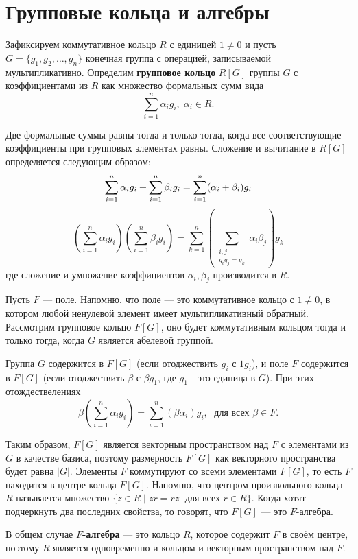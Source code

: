 \section{Групповые кольца и алгебры}\label{group_algebra}

Зафиксируем коммутативное кольцо $R$ с единицей $1 \neq 0$ и пусть $G = \{ g_1, g_2, \ldots, g_n\}$ конечная группа с операцией, записываемой мультипликативно. Определим \textbf{групповое кольцо} $R[G]$ группы $G$ с коэффициентами из $R$ как множество формальных сумм вида 
\[
	\sum\limits_{i=1}^{n} \alpha_i g_i, \; \alpha_i \in R.
\]

Две формальные суммы равны тогда и только тогда, когда все соответствующие коэффициенты при групповых элементах равны. Сложение и вычитание в $R[G]$ определяется следующим образом:
\[
 \sum\limits_{i=1}^{n} \alpha_i g_i + \sum\limits_{i=1}^{n} \beta_i g_i = \sum\limits_{i=1}^{n} (\alpha_i + \beta_i) g_i \\
\]
\[  
 \left( \sum\limits_{i=1}^{n} \alpha_i g_i \right) \left(\sum\limits_{i=1}^{n} \beta_i g_i \right) =  
 \sum\limits_{k=1}^{n} \left(\sum_{\substack{i,j\\g_i g_j = g_k}} \alpha_i \beta_j\right) g_k
\]	
где сложение и умножение коэффициентов $\alpha_i, \beta_j$ производится в $R$.

Пусть $F$ --- поле. Напомню, что поле --- это коммутативное кольцо с $1 \neq 0$, в котором любой ненулевой элемент имеет мультипликативный обратный. Рассмотрим групповое кольцо $F[G]$, оно будет коммутативным кольцом тогда и только тогда, когда $G$ является абелевой группой.

Группа $G$ содержится в $F[G]$ (если отоджествить $g_i$ с $1 g_i$), и поле $F$ содержится в $F[G]$ (если отоджествить $\beta$ с $\beta g_1$, где $g_1$ - это единица в $G$). При этих отождествелениях 
\[
	\beta \left( \sum\limits_{i=1}^{n} \alpha_i g_i \right) = \sum\limits_{i=1}^{n} (\beta \alpha_i) g_i, \; \mbox{ для всех } \beta \in F.
\]

Таким образом, $F[G]$ является векторным пространством над $F$ с элементами из $G$ в качестве базиса, поэтому размерность $F[G]$ как векторного пространства будет равна $|G|$. 
Элементы $F$ коммутируют со всеми элементами $F[G]$, то есть $F$ находится в центре кольца $F[G]$. Напомню, что центром произвольного кольца $R$ называется множество $\{ z \in R \mid zr = rz \; \mbox{ для всех } r \in R \}$. Когда хотят подчеркнуть два последних свойства, то говорят, что $F[G]$ --- это $F$-алгебра.

В общем случае \textbf{$F$-алгебра} --- это кольцо $R$, которое содержит $F$ в своём центре, поэтому $R$ является одновременно и кольцом и векторным пространством над $F$.

